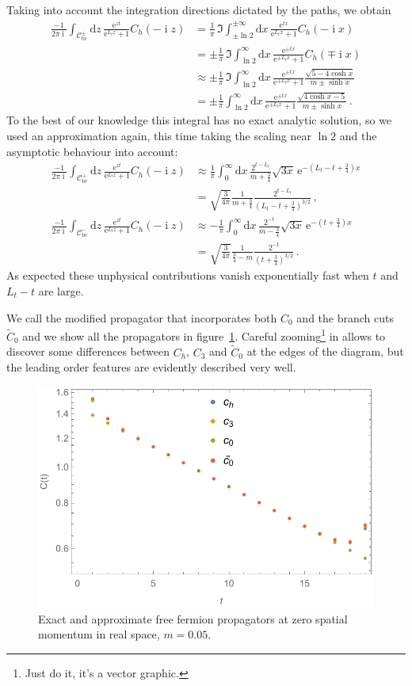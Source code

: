 \documentclass[a4paper]{article}
\DeclareMathOperator{\im}{i}
\newcommand{\eto}[1]{\ensuremath{\mathrm{e}^{#1}}}
\newcommand{\md}{\ensuremath{\mathrm{d}}}
\begin{document}
	Taking into account the integration directions dictated by the paths, we obtain
	\begin{align}
		\frac{-1}{2\pi\im}\int_{\mathcal{C}_\text{bc}^\pm}\md z\, \frac{\eto{z t}}{\eto{L_t z}+1}C_h(-\im z)
		&= \frac1\pi\,\Im\int_{\pm\ln2}^{\pm\infty}\md x\, \frac{\eto{t x}}{\eto{L_t x}+1}C_h(-\im x)\\
		&= \pm\frac1\pi\,\Im\int_{\ln2}^{\infty}\md x\, \frac{\eto{\pm t x}}{\eto{\pm L_t x}+1}C_h(\mp\im x)\\
		&\approx \pm\frac1\pi\,\Im\int_{\ln2}^{\infty}\md x\, \frac{\eto{\pm t x}}{\eto{\pm L_t x}+1}\frac{\sqrt{5-4 \cosh x}}{m\pm\sinh x}\\
		&= \pm\frac1\pi\int_{\ln2}^{\infty}\md x\, \frac{\eto{\pm t x}}{\eto{\pm L_t x}+1}\frac{\sqrt{4 \cosh x-5}}{m\pm\sinh x}\,.
	\end{align}
	To the best of our knowledge this integral has no exact analytic solution, so we used an approximation again, this time taking the scaling near $\ln2$ and the asymptotic behaviour into account:
	\begin{align}
		\frac{-1}{2\pi\im}\int_{\mathcal{C}_\text{bc}^+}\md z\, \frac{\eto{z t}}{\eto{L_t z}+1}C_h(-\im z)
		&\approx \frac1\pi\int_{0}^{\infty}\md x\,\frac{2^{t-L_t}}{m+\frac{3}{4}}\sqrt{3x}\,\eto{-\left(L_t-t+\frac{3}{4}\right) x}\\
		&=\sqrt{\frac3{4\pi}}\frac{1}{m+\frac34}\frac{2^{t-L_t}}{\left(L_t-t+\frac34\right)^{3/2}}\,,\\
		\frac{-1}{2\pi\im}\int_{\mathcal{C}_\text{bc}^-}\md z\, \frac{\eto{z t}}{\eto{L_t z}+1}C_h(-\im z)
		&\approx -\frac1\pi\int_{0}^{\infty}\md x\,\frac{2^{-t}}{m-\frac{3}{4}}\sqrt{3x}\,\eto{-\left(t+\frac{3}{4}\right) x}\\
		&=\sqrt{\frac3{4\pi}}\frac{1}{\frac34-m}\frac{2^{-t}}{\left(t+\frac34\right)^{3/2}}\,.
	\end{align}
	As expected these unphysical contributions vanish exponentially fast when $t$ and $L_t-t$ are large.
	
	We call the modified propagator that incorporates both $C_0$ and the branch cuts $\tilde C_0$ and we show all the propagators in figure~\ref{fig:free_prop_real_space}. Careful zooming\footnote{Just do it, it's a vector graphic.} in allows to discover some differences between $C_h$, $C_3$ and $\tilde C_0$ at the edges of the diagram, but the leading order features are evidently described very well.
	
	\begin{figure}[htp]
		\centering
		\includegraphics[width=.9\textwidth]{free-prop_real-space}
		\caption{Exact and approximate free fermion propagators at zero spatial momentum in real space, $m=\num{0.05}$.}\label{fig:free_prop_real_space}
	\end{figure}
	
	\clearpage
	\printbibliography
\end{document}

